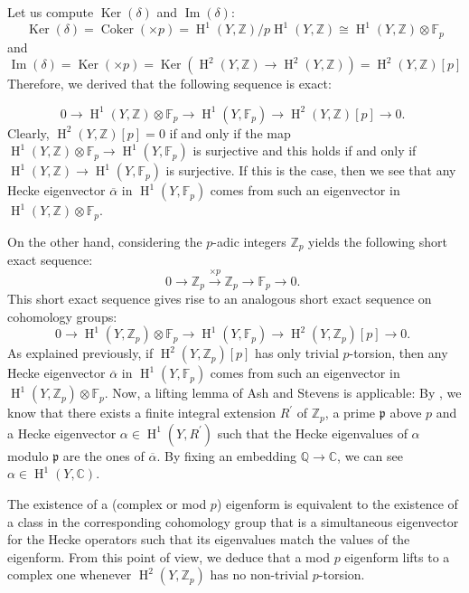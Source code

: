 \documentclass[]{article}
\newcommand {\ZZ}{{\mathbb{Z}}}
\newcommand {\QQ}{{\mathbb{Q}}}
\DeclareMathOperator{\im}{Im}
\DeclareMathOperator{\coker}{Coker}
\DeclareMathOperator{\Ker}{Ker}
\begin{document}
Let us compute $\Ker(\delta)$ and $\im(\delta)$:
$$\Ker(\delta)=\coker(\times p)=\operatorname{H}^1(Y,\ZZ)/p\operatorname{H}^1(Y,\ZZ)\cong \operatorname{H}^1(Y,\ZZ)\otimes\mathbb{F}_p$$and
$$\im(\delta)=\Ker(\times p)=\Ker\left(\operatorname{H}^2(Y,\ZZ)\to \operatorname{H}^2(Y,\ZZ)\right)=\operatorname{H}^2(Y,\ZZ)[p]$$Therefore, we derived that the following sequence is exact:

$$
0 \longrightarrow \operatorname{H}^1(Y,\ZZ)\otimes\mathbb{F}_p \longrightarrow \operatorname{H}^1(Y,\mathbb{F}_p) \longrightarrow \operatorname{H}^2(Y,\ZZ)[p] \longrightarrow 0 \text {. }
$$Clearly, $\operatorname{H}^2(Y,\ZZ)[p]=0$ if and only if the map $\operatorname{H}^1(Y,\ZZ)\otimes\mathbb{F}_p \longrightarrow \operatorname{H}^1(Y,\mathbb{F}_p)$ is surjective and this holds if and only if $\operatorname{H}^1(Y,\ZZ)\to \operatorname{H}^1(Y,\mathbb{F}_p)$ is surjective. If this is the case, then we see that any Hecke eigenvector $\overline{\alpha}$ in $\operatorname{H}^1(Y,\mathbb{F}_p)$ comes from such an eigenvector in $\operatorname{H}^1(Y,\ZZ)\otimes\mathbb{F}_p $.

On the other hand, considering the $p$-adic integers $\ZZ_p$ yields the following short exact sequence:$$
    0 \longrightarrow \mathbb{Z}_p \xrightarrow{\times p} \mathbb{Z}_p \longrightarrow \mathbb{F}_p \longrightarrow 0 \text {. }
$$This short exact sequence gives rise to an analogous short exact sequence on cohomology groups: 
$$
0 \longrightarrow \operatorname{H}^1(Y,\ZZ_p)\otimes\mathbb{F}_p \longrightarrow \operatorname{H}^1(Y,\mathbb{F}_p) \longrightarrow \operatorname{H}^2(Y,\ZZ_p)[p] \longrightarrow 0 \text {. }
$$As explained previously, if $\operatorname{H}^2(Y,\ZZ_p)[p]$ has only trivial $p$-torsion, then any Hecke eigenvector $\overline{\alpha}$ in $\operatorname{H}^1(Y,\mathbb{F}_p)$ comes from such an eigenvector in $\operatorname{H}^1(Y,\ZZ_p)\otimes\mathbb{F}_p $. Now, a lifting lemma of Ash and Stevens is applicable: By \cite[Proposition 1.2.2]{ash1986cohomology}, we know that there exists a finite integral extension $R^{\prime}$ of $\ZZ_p$, a prime $\mathfrak{p}$ above $p$ and a Hecke eigenvector $\alpha \in \operatorname{H}^1(Y, R^{\prime})$ such that the Hecke eigenvalues of $\alpha$ modulo $\mathfrak{p}$ are the ones of $\overline{\alpha}$. By fixing an embedding $\QQ\to \mathbb{C}$, we can see $\alpha\in \operatorname{H}^1(Y, \mathbb{C})$.

The existence of a (complex or mod $p$) eigenform is equivalent to the existence of a class in the corresponding cohomology group that is a simultaneous eigenvector for the Hecke operators such
that its eigenvalues match the values of the eigenform. From this point of view, we deduce that a mod $p$ eigenform lifts to a complex one whenever $\operatorname{H}^2(Y,\ZZ_p)$ has no non-trivial $p$-torsion.
\end{document}
